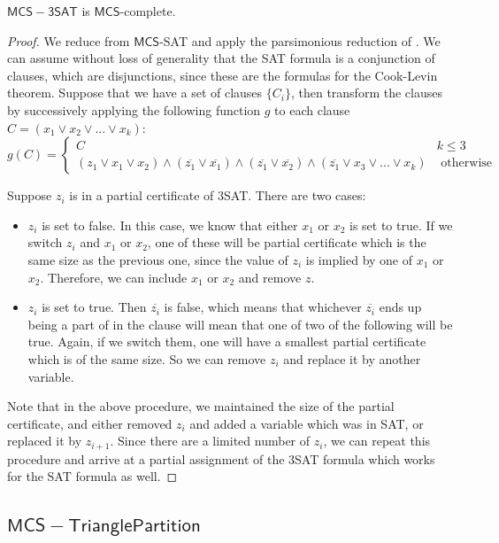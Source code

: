 \documentclass[runningheads,a4paper]{llncs}
\begin{document}
\begin{theorem}
$\mathsf{MCS-3SAT}$ is $\mathsf{MCS}$-complete.
\end{theorem}

\begin{proof}
We reduce from $\mathsf{MCS}$-SAT and apply the parsimonious reduction of \cite{yaleclass}. We can assume without loss of generality that the SAT formula is a conjunction of clauses, which are disjunctions, since these are the formulas for the Cook-Levin theorem. Suppose that we have a set of clauses $\{ C_i \}$, then transform the clauses by successively applying the following function $g$ to each clause $C = (x_1 \vee x_2 \vee ... \vee x_k)$:
\[ g(C) = \left\{ \begin{array}{cc} C & k \leq 3 \\
						    (z_1 \vee x_1 \vee x_2) \wedge (\overline{z_1} \vee \overline{x_1}) \wedge (\overline{z_1} \vee \overline{x_2}) \wedge (\overline{z_1} \vee x_3 \vee ... \vee x_k) & \text{ otherwise }\end{array} \right. \] 

Suppose $z_i$ is in a partial certificate of 3SAT. There are two cases:
\begin{itemize}
\item $z_i$ is set to false. In this case, we know that either $x_1$ or $x_2$ is set to true. If we switch $z_i$ and $x_1$ or $x_2$, one of these will be partial certificate which is the same size as the previous one, since the value of $z_i$ is implied by one of $x_1$ or $x_2$. Therefore, we can include $x_1$ or $x_2$ and remove $z$.
\item $z_i$ is set to true. Then $\overline{z_i}$ is false, which means that whichever $\overline{z_i}$ ends up being a part of in the clause will mean that one of two of the following will be true. Again, if we switch them, one will have a smallest partial certificate which is of the same size. So we can remove $z_i$ and replace it by another variable. 
\end{itemize}
Note that in the above procedure, we maintained the size of the partial certificate, and either removed $z_i$ and added a variable which was in SAT, or replaced it by $z_{i+1}$. Since there are a limited number of $z_i$, we can repeat this procedure and arrive at a partial assignment of the 3SAT formula which works for the SAT formula as well.
\end{proof}

\subsection{$\mathsf{MCS-Triangle Partition}$}
\end{document}

